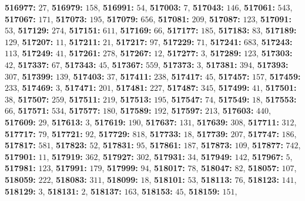 \textsf{\bfseries 516977:} $27$, \textsf{\bfseries 516979:} $158$, \textsf{\bfseries 516991:} $54$, \textsf{\bfseries 517003:} $7$, \textsf{\bfseries 517043:} $146$, \textsf{\bfseries 517061:} $543$, \textsf{\bfseries 517067:} $171$, \textsf{\bfseries 517073:} $195$, \textsf{\bfseries 517079:} $656$, \textsf{\bfseries 517081:} $209$, \textsf{\bfseries 517087:} $123$, \textsf{\bfseries 517091:} $53$, \textsf{\bfseries 517129:} $274$, \textsf{\bfseries 517151:} $611$, \textsf{\bfseries 517169:} $66$, \textsf{\bfseries 517177:} $185$, \textsf{\bfseries 517183:} $83$, \textsf{\bfseries 517189:} $129$, \textsf{\bfseries 517207:} $11$, \textsf{\bfseries 517211:} $21$, \textsf{\bfseries 517217:} $97$, \textsf{\bfseries 517229:} $71$, \textsf{\bfseries 517241:} $683$, \textsf{\bfseries 517243:} $113$, \textsf{\bfseries 517249:} $41$, \textsf{\bfseries 517261:} $278$, \textsf{\bfseries 517267:} $12$, \textsf{\bfseries 517277:} $3$, \textsf{\bfseries 517289:} $123$, \textsf{\bfseries 517303:} $42$, \textsf{\bfseries 517337:} $67$, \textsf{\bfseries 517343:} $45$, \textsf{\bfseries 517367:} $559$, \textsf{\bfseries 517373:} $3$, \textsf{\bfseries 517381:} $394$, \textsf{\bfseries 517393:} $307$, \textsf{\bfseries 517399:} $139$, \textsf{\bfseries 517403:} $37$, \textsf{\bfseries 517411:} $238$, \textsf{\bfseries 517417:} $45$, \textsf{\bfseries 517457:} $157$, \textsf{\bfseries 517459:} $233$, \textsf{\bfseries 517469:} $3$, \textsf{\bfseries 517471:} $201$, \textsf{\bfseries 517481:} $227$, \textsf{\bfseries 517487:} $345$, \textsf{\bfseries 517499:} $41$, \textsf{\bfseries 517501:} $38$, \textsf{\bfseries 517507:} $259$, \textsf{\bfseries 517511:} $219$, \textsf{\bfseries 517513:} $195$, \textsf{\bfseries 517547:} $74$, \textsf{\bfseries 517549:} $18$, \textsf{\bfseries 517553:} $66$, \textsf{\bfseries 517571:} $534$, \textsf{\bfseries 517577:} $180$, \textsf{\bfseries 517589:} $192$, \textsf{\bfseries 517597:} $213$, \textsf{\bfseries 517603:} $440$, \textsf{\bfseries 517609:} $29$, \textsf{\bfseries 517613:} $3$, \textsf{\bfseries 517619:} $190$, \textsf{\bfseries 517637:} $131$, \textsf{\bfseries 517639:} $308$, \textsf{\bfseries 517711:} $312$, \textsf{\bfseries 517717:} $79$, \textsf{\bfseries 517721:} $92$, \textsf{\bfseries 517729:} $818$, \textsf{\bfseries 517733:} $18$, \textsf{\bfseries 517739:} $207$, \textsf{\bfseries 517747:} $186$, \textsf{\bfseries 517817:} $581$, \textsf{\bfseries 517823:} $52$, \textsf{\bfseries 517831:} $95$, \textsf{\bfseries 517861:} $187$, \textsf{\bfseries 517873:} $109$, \textsf{\bfseries 517877:} $742$, \textsf{\bfseries 517901:} $11$, \textsf{\bfseries 517919:} $362$, \textsf{\bfseries 517927:} $302$, \textsf{\bfseries 517931:} $34$, \textsf{\bfseries 517949:} $142$, \textsf{\bfseries 517967:} $5$, \textsf{\bfseries 517981:} $123$, \textsf{\bfseries 517991:} $179$, \textsf{\bfseries 517999:} $94$, \textsf{\bfseries 518017:} $78$, \textsf{\bfseries 518047:} $82$, \textsf{\bfseries 518057:} $107$, \textsf{\bfseries 518059:} $222$, \textsf{\bfseries 518083:} $311$, \textsf{\bfseries 518099:} $18$, \textsf{\bfseries 518101:} $53$, \textsf{\bfseries 518113:} $76$, \textsf{\bfseries 518123:} $141$, \textsf{\bfseries 518129:} $3$, \textsf{\bfseries 518131:} $2$, \textsf{\bfseries 518137:} $163$, \textsf{\bfseries 518153:} $45$, \textsf{\bfseries 518159:} $151$, 

